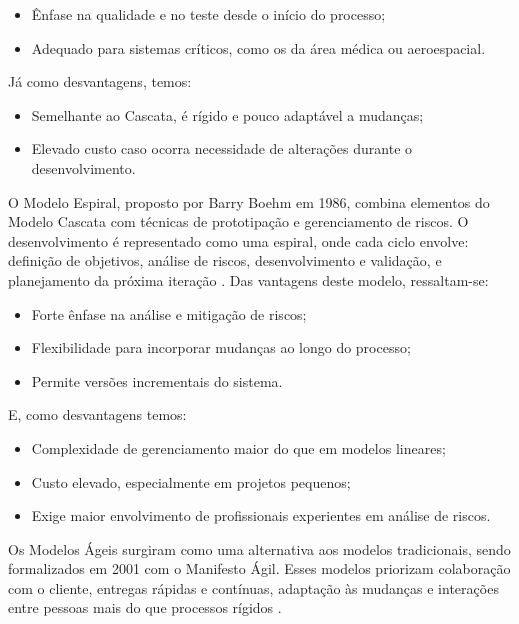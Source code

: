 \documentclass[english,brazilian]{UNISINOSartigo} %
\begin{document}
\begin{itemize}[leftmargin=1cm, itemsep=0.1em, topsep=0.1em]
    \item Ênfase na qualidade e no teste desde o início do processo;
    \item Adequado para sistemas críticos, como os da área médica ou aeroespacial.
\end{itemize}

Já como desvantagens, temos:

\begin{itemize}[leftmargin=1cm, itemsep=0.1em, topsep=0.1em]
    \item Semelhante ao Cascata, é rígido e pouco adaptável a mudanças;
    \item Elevado custo caso ocorra necessidade de alterações durante o desenvolvimento.
\end{itemize}

O Modelo Espiral, proposto por Barry Boehm em 1986, combina elementos do Modelo Cascata com técnicas de prototipação e gerenciamento de riscos. O desenvolvimento é representado como uma espiral, onde cada ciclo envolve: definição de objetivos, análise de riscos, desenvolvimento e validação, e planejamento da próxima iteração \cite{boehm1988}. Das vantagens deste modelo, ressaltam-se:

\begin{itemize}[leftmargin=1cm, itemsep=0.1em, topsep=0.1em]
    \item Forte ênfase na análise e mitigação de riscos;
    \item Flexibilidade para incorporar mudanças ao longo do processo;
    \item Permite versões incrementais do sistema.
\end{itemize}

E, como desvantagens temos:

\begin{itemize}[leftmargin=1cm, itemsep=0.1em, topsep=0.1em]
    \item Complexidade de gerenciamento maior do que em modelos lineares;
    \item Custo elevado, especialmente em projetos pequenos;
    \item Exige maior envolvimento de profissionais experientes em análise de riscos.
\end{itemize}

Os Modelos Ágeis surgiram como uma alternativa aos modelos tradicionais, sendo formalizados em 2001 com o Manifesto Ágil. Esses modelos priorizam colaboração com o cliente, entregas rápidas e contínuas, adaptação às mudanças e interações entre pessoas mais do que processos rígidos \cite{beck2001}.
\end{document}
